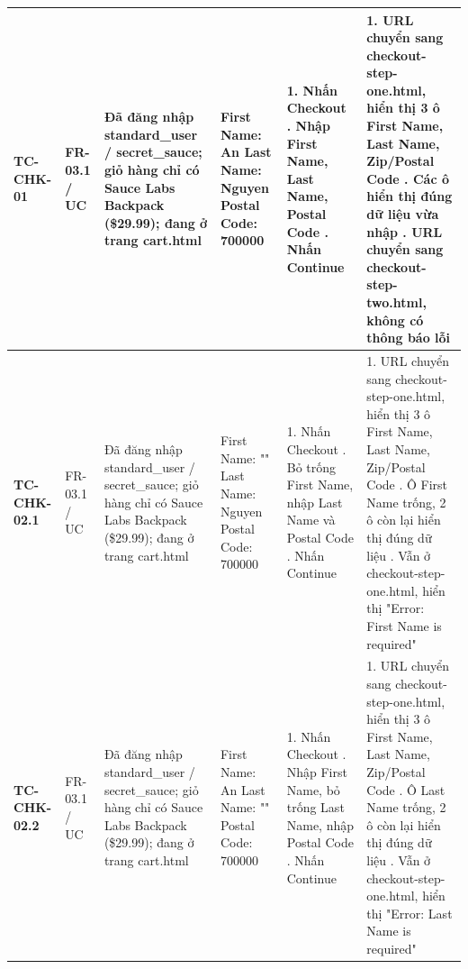 {\begin{longtable}{|L{3.5cm}|L{1.9cm}|L{4.6cm}|L{3.7cm}|L{5.1cm}|L{5.1cm}|}
\hline
\textbf{\mbox{TC-CHK-01}} & FR-03.1 / UC & Đã đăng nhập standard\_\allowbreak{}user / secret\_\allowbreak{}sauce; giỏ hàng chỉ có Sauce Labs Backpack (\$29.99); đang ở trang cart.html & First Name: An \newline Last Name: Nguyen \newline Postal Code: 700000 & 1. Nhấn Checkout . Nhập First Name, Last Name, Postal Code . Nhấn Continue & 1. URL chuyển sang checkout-step-one.html, hiển thị 3 ô First Name, Last Name, Zip/Postal Code . Các ô hiển thị đúng dữ liệu vừa nhập . URL chuyển sang checkout-step-two.html, không có thông báo lỗi \\
\hline
\textbf{\mbox{TC-CHK-02.1}} & FR-03.1 / UC & Đã đăng nhập standard\_\allowbreak{}user / secret\_\allowbreak{}sauce; giỏ hàng chỉ có Sauce Labs Backpack (\$29.99); đang ở trang cart.html & First Name: "" \newline Last Name: Nguyen \newline Postal Code: 700000 & 1. Nhấn Checkout . Bỏ trống First Name, nhập Last Name và Postal Code . Nhấn Continue & 1. URL chuyển sang checkout-step-one.html, hiển thị 3 ô First Name, Last Name, Zip/Postal Code . Ô First Name trống, 2 ô còn lại hiển thị đúng dữ liệu . Vẫn ở checkout-step-one.html, hiển thị "Error: First Name is required" \\
\hline
\textbf{\mbox{TC-CHK-02.2}} & FR-03.1 / UC & Đã đăng nhập standard\_\allowbreak{}user / secret\_\allowbreak{}sauce; giỏ hàng chỉ có Sauce Labs Backpack (\$29.99); đang ở trang cart.html & First Name: An \newline Last Name: "" \newline Postal Code: 700000 & 1. Nhấn Checkout . Nhập First Name, bỏ trống Last Name, nhập Postal Code . Nhấn Continue & 1. URL chuyển sang checkout-step-one.html, hiển thị 3 ô First Name, Last Name, Zip/Postal Code . Ô Last Name trống, 2 ô còn lại hiển thị đúng dữ liệu . Vẫn ở checkout-step-one.html, hiển thị "Error: Last Name is required" \\

\end{longtable}}
